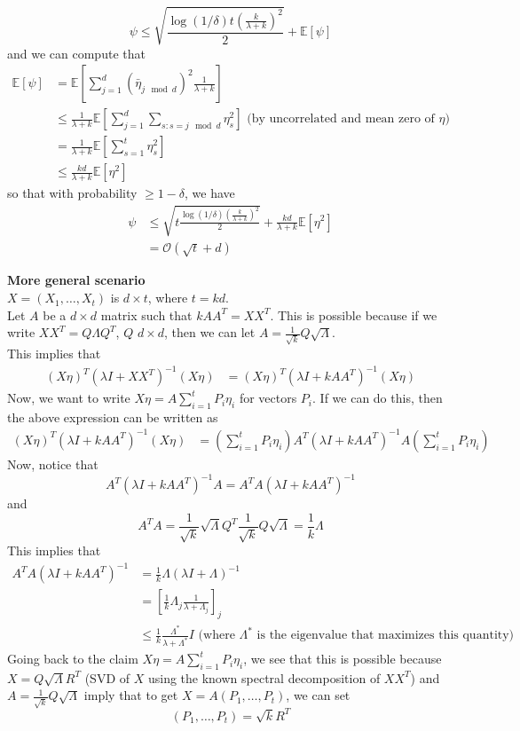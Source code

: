 \documentclass[10pt]{article}
\theoremstyle{plain}%
\theoremstyle{definition}
\newcommand{\cO}{\mathcal{O}}
\newcommand{\<}{\langle}
\renewcommand{\>}{\rangle}
\renewcommand{\[}{\left[}
\renewcommand{\]}{\right]}
\renewcommand{\(}{\left(}
\renewcommand{\)}{\right)}
\renewcommand{\d}{\delta}
\newcommand{\E}{\mathbb{E}}
\begin{document}
$$\psi \leq \sqrt{\frac{\log(1/\d) t \left(\frac{k}{\lambda + k}\right)^2}{2}} + \E[\psi]$$
and we can compute that
\begin{align*}
\E[\psi] 
&= \E[\sum_{j=1}^d (\bar{\eta}_{j \mod d})^2 \frac{1}{\lambda + k}] \\
&\leq \frac{1}{\lambda + k} \E[\sum_{j=1}^d \sum_{s: s =j \mod d} \eta_s^2] \text{ (by uncorrelated and mean zero of $\eta$)}\\
&= \frac{1}{\lambda + k} \E[\sum_{s=1}^t \eta_s^2] \\
&\leq \frac{kd}{\lambda + k} \E[\eta^2] 
\end{align*}
so that with probability $\geq 1- \d$, we have
\begin{align*}
\psi 
&\leq \sqrt{t\frac{\log(1/\d) \left(\frac{k}{\lambda + k}\right)^2}{2}} + \frac{kd}{\lambda + k} \E[\eta^2]  \\
&= \cO(\sqrt{t} + d)
\end{align*}

{\bf More general scenario}\\

$X = (X_1,\ldots, X_t)$ is $d \times t$, where $t = kd$.\\

Let $A$ be a $d \times d$ matrix such that $k AA^T = XX^T$. This is possible because if we write $XX^T = Q \Lambda Q^T$, $Q$ $d \times d$, then we can let
$A = \frac{1}{\sqrt{k}} Q \sqrt{\Lambda}$.\\

This implies that 
\begin{align*}
 (X\eta)^T (\lambda I + XX^T)^{-1}(X\eta)
&= (X\eta)^T(\lambda I + k AA^T)^{-1}(X\eta)
\end{align*}
Now, we want to write $X\eta = A \sum_{i=1}^t P_i \eta_i$ for vectors $P_i$. If we can do this, then the above expression can be written as
\begin{align*}
 (X\eta)^T(\lambda I + k AA^T)^{-1}(X\eta)
&= (\sum_{i=1}^t P_i \eta_i) A^T (\lambda I + k AA^T)^{-1} A (\sum_{i=1}^t P_i \eta_i) 
\end{align*}
Now, notice that 
$$A^T (\lambda I + k AA^T)^{-1} A = A^TA(\lambda I + k AA^T)^{-1}$$
and 
$$A^TA = \frac{1}{\sqrt{k}} \sqrt{\Lambda} Q^T \frac{1}{\sqrt{k}} Q \sqrt{\Lambda} = \frac{1}{k} \Lambda$$
This implies that 
\begin{align*}
A^TA(\lambda I + k AA^T)^{-1} 
&= \frac{1}{k} \Lambda(\lambda I + \Lambda)^{-1}\\
&= [\frac{1}{k} \Lambda_j \frac{1}{\lambda + \Lambda_j}]_j \\ 
&\leq \frac{1}{k} \frac{\Lambda^*}{\lambda + \Lambda^*} I \text{ (where $\Lambda^*$ is the eigenvalue that maximizes this quantity)}
\end{align*}
Going back to the claim $X\eta = A \sum_{i=1}^t P_i \eta_i$, we see that this is possible because 
$X = Q\sqrt{\Lambda}R^T$ (SVD of $X$ using the known spectral decomposition of $XX^T$)
 and $A = \frac{1}{\sqrt{k}}Q\sqrt{\Lambda}$ imply that to get $X = A(P_1,\ldots,P_t)$, we can set
$$(P_1,\ldots,P_t) = \sqrt{k}R^T$$
\end{document}
